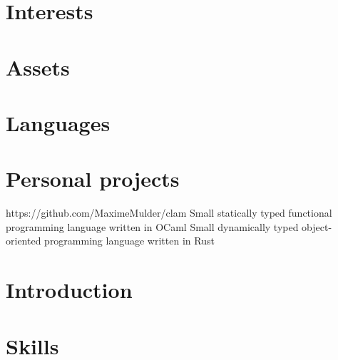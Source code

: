 \documentclass[letterpaper]{template}
\begin{document}
\makeprofile

\section{Interests}

\begin{interests}
\end{interests}

\section{Assets}

\begin{assets}
\end{assets}

\section{Languages}

\begin{naturallanguages}
\end{naturallanguages}

\section{Personal projects}

\begin{projects}
  	{https://github.com/MaximeMulder/clam}
  	{Small statically typed functional programming language written in OCaml}
  	{Small dynamically typed object-oriented programming language written in Rust}
\end{projects}

\switch

\section{Introduction}


\section{Skills}
\end{document}
